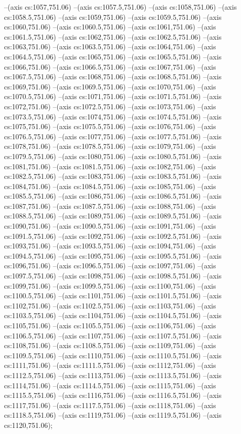 --(axis cs:1057,751.06)
--(axis cs:1057.5,751.06)
--(axis cs:1058,751.06)
--(axis cs:1058.5,751.06)
--(axis cs:1059,751.06)
--(axis cs:1059.5,751.06)
--(axis cs:1060,751.06)
--(axis cs:1060.5,751.06)
--(axis cs:1061,751.06)
--(axis cs:1061.5,751.06)
--(axis cs:1062,751.06)
--(axis cs:1062.5,751.06)
--(axis cs:1063,751.06)
--(axis cs:1063.5,751.06)
--(axis cs:1064,751.06)
--(axis cs:1064.5,751.06)
--(axis cs:1065,751.06)
--(axis cs:1065.5,751.06)
--(axis cs:1066,751.06)
--(axis cs:1066.5,751.06)
--(axis cs:1067,751.06)
--(axis cs:1067.5,751.06)
--(axis cs:1068,751.06)
--(axis cs:1068.5,751.06)
--(axis cs:1069,751.06)
--(axis cs:1069.5,751.06)
--(axis cs:1070,751.06)
--(axis cs:1070.5,751.06)
--(axis cs:1071,751.06)
--(axis cs:1071.5,751.06)
--(axis cs:1072,751.06)
--(axis cs:1072.5,751.06)
--(axis cs:1073,751.06)
--(axis cs:1073.5,751.06)
--(axis cs:1074,751.06)
--(axis cs:1074.5,751.06)
--(axis cs:1075,751.06)
--(axis cs:1075.5,751.06)
--(axis cs:1076,751.06)
--(axis cs:1076.5,751.06)
--(axis cs:1077,751.06)
--(axis cs:1077.5,751.06)
--(axis cs:1078,751.06)
--(axis cs:1078.5,751.06)
--(axis cs:1079,751.06)
--(axis cs:1079.5,751.06)
--(axis cs:1080,751.06)
--(axis cs:1080.5,751.06)
--(axis cs:1081,751.06)
--(axis cs:1081.5,751.06)
--(axis cs:1082,751.06)
--(axis cs:1082.5,751.06)
--(axis cs:1083,751.06)
--(axis cs:1083.5,751.06)
--(axis cs:1084,751.06)
--(axis cs:1084.5,751.06)
--(axis cs:1085,751.06)
--(axis cs:1085.5,751.06)
--(axis cs:1086,751.06)
--(axis cs:1086.5,751.06)
--(axis cs:1087,751.06)
--(axis cs:1087.5,751.06)
--(axis cs:1088,751.06)
--(axis cs:1088.5,751.06)
--(axis cs:1089,751.06)
--(axis cs:1089.5,751.06)
--(axis cs:1090,751.06)
--(axis cs:1090.5,751.06)
--(axis cs:1091,751.06)
--(axis cs:1091.5,751.06)
--(axis cs:1092,751.06)
--(axis cs:1092.5,751.06)
--(axis cs:1093,751.06)
--(axis cs:1093.5,751.06)
--(axis cs:1094,751.06)
--(axis cs:1094.5,751.06)
--(axis cs:1095,751.06)
--(axis cs:1095.5,751.06)
--(axis cs:1096,751.06)
--(axis cs:1096.5,751.06)
--(axis cs:1097,751.06)
--(axis cs:1097.5,751.06)
--(axis cs:1098,751.06)
--(axis cs:1098.5,751.06)
--(axis cs:1099,751.06)
--(axis cs:1099.5,751.06)
--(axis cs:1100,751.06)
--(axis cs:1100.5,751.06)
--(axis cs:1101,751.06)
--(axis cs:1101.5,751.06)
--(axis cs:1102,751.06)
--(axis cs:1102.5,751.06)
--(axis cs:1103,751.06)
--(axis cs:1103.5,751.06)
--(axis cs:1104,751.06)
--(axis cs:1104.5,751.06)
--(axis cs:1105,751.06)
--(axis cs:1105.5,751.06)
--(axis cs:1106,751.06)
--(axis cs:1106.5,751.06)
--(axis cs:1107,751.06)
--(axis cs:1107.5,751.06)
--(axis cs:1108,751.06)
--(axis cs:1108.5,751.06)
--(axis cs:1109,751.06)
--(axis cs:1109.5,751.06)
--(axis cs:1110,751.06)
--(axis cs:1110.5,751.06)
--(axis cs:1111,751.06)
--(axis cs:1111.5,751.06)
--(axis cs:1112,751.06)
--(axis cs:1112.5,751.06)
--(axis cs:1113,751.06)
--(axis cs:1113.5,751.06)
--(axis cs:1114,751.06)
--(axis cs:1114.5,751.06)
--(axis cs:1115,751.06)
--(axis cs:1115.5,751.06)
--(axis cs:1116,751.06)
--(axis cs:1116.5,751.06)
--(axis cs:1117,751.06)
--(axis cs:1117.5,751.06)
--(axis cs:1118,751.06)
--(axis cs:1118.5,751.06)
--(axis cs:1119,751.06)
--(axis cs:1119.5,751.06)
--(axis cs:1120,751.06);

